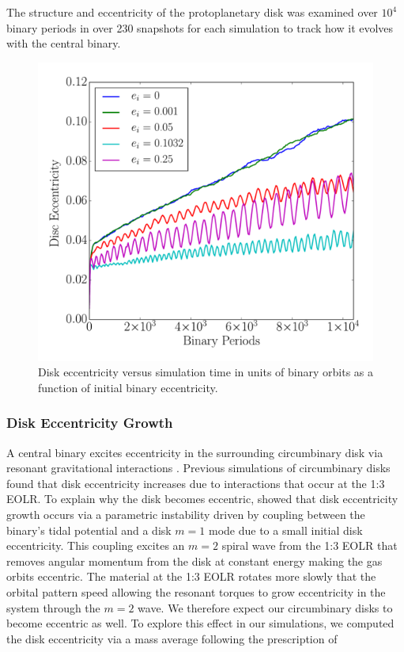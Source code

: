 The structure and eccentricity of the protoplanetary disk was examined over $10^4$ binary periods in over 230 snapshots
for each simulation to track how it evolves with the central binary.

\begin{figure}
	\includegraphics[width=\columnwidth]{f2}
    \caption{Disk eccentricity versus simulation time in units of binary orbits as a function of initial binary eccentricity.}
    \label{fig:CBDiskDiskEcc}
\end{figure}


\subsubsection{Disk Eccentricity Growth} \label{CBDisk:sec:discEccEvolution}

A central binary excites eccentricity in the surrounding
circumbinary disk via resonant gravitational interactions
\citep{Papaloizou2001,Artymowicz1996a}.  Previous simulations of circumbinary
disks \citep{Kley2008,Papaloizou2001,Pierens2007,Pierens2013} found
that disk eccentricity increases due to interactions that occur at
the 1:3 EOLR.  To explain why the disk becomes eccentric, \citet{Papaloizou2001} showed that disk eccentricity growth occurs via a parametric instability driven by coupling between the binary's tidal potential and a disk $m = 1$ mode due to a small initial disk eccentricity.  This coupling excites an $m = 2$ spiral wave from the 1:3 EOLR that removes angular momentum from the disk at constant energy making the gas orbits eccentric.  The material at the 1:3 EOLR rotates more slowly that the orbital pattern speed allowing the resonant torques to grow eccentricity in the system through the $m = 2$ wave.  We therefore expect our circumbinary disks to become eccentric as well.  To explore this effect in our simulations, we computed the disk eccentricity via a mass average following the prescription of \citet{Pierens2007}

